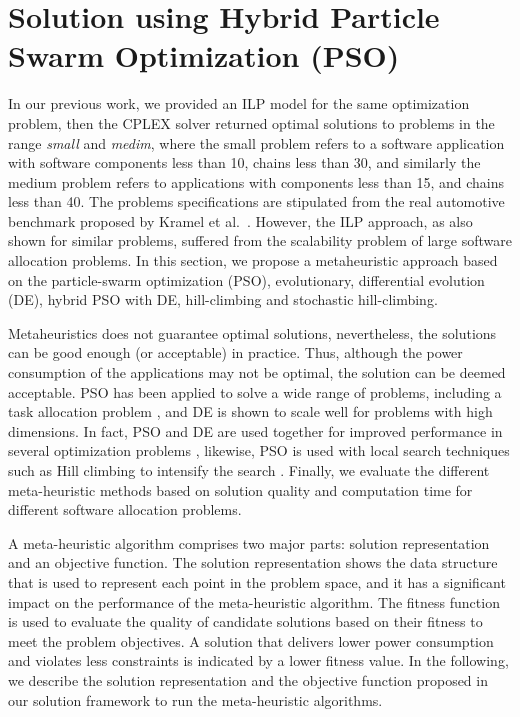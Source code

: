 \section{Solution using Hybrid Particle Swarm Optimization (PSO)}\label{sec_solution}
In our previous work, we provided an ILP model for the same optimization problem, then the CPLEX solver returned optimal solutions to problems in the range \textit{small} and \textit{medim}, where the small problem refers to a software application with software components less than 10, chains less than 30, and similarly the medium problem refers to applications with components less than 15, and chains less than 40. The problems specifications are stipulated from the real automotive benchmark proposed by Kramel et al.~\cite{Kramer2015RealFree}. However, the ILP approach, as also shown for similar problems, suffered from the scalability problem of large software allocation problems. In this section, we propose a metaheuristic approach based on the particle-swarm optimization (PSO), evolutionary, differential evolution (DE), hybrid PSO with DE,  hill-climbing and stochastic hill-climbing. 

Metaheuristics does not guarantee optimal solutions, nevertheless, the solutions can be good enough (or acceptable) in practice. Thus, although the power consumption of the applications may not be optimal, the solution can be deemed acceptable. PSO has been applied to solve a wide range of problems, including a task allocation problem \cite{yin2007task}, and DE is shown to scale well for problems with high dimensions. In fact, PSO and DE are used together for improved performance in several optimization problems \cite{bibid}, likewise, PSO is used with local search techniques such as Hill climbing to intensify the search \cite{bibid}. Finally, we evaluate the different meta-heuristic methods based on solution quality and computation time for different software allocation problems.

A meta-heuristic algorithm comprises two major parts: solution representation and an objective function. The solution representation shows the data structure that is used to represent each point in the problem space, and it has a significant impact on the performance of the meta-heuristic algorithm. The fitness function is used to evaluate the quality of candidate solutions based on their fitness to meet the problem objectives. A solution that delivers lower power consumption and violates less constraints is indicated by a lower fitness value. In the following, we describe the solution representation and the objective function proposed in our solution framework to run the meta-heuristic algorithms. 


